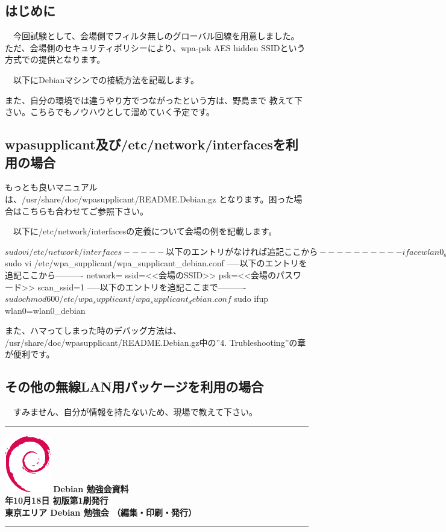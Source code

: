 \documentclass[mingoth,a4paper]{jsarticle}
\newcommand{\debmtgyear}{2015}
\newcommand{\debmtgmonth}{10}
\newcommand{\debmtgdate}{18}
\begin{document}
 \subsection{はじめに}

　今回試験として、会場側でフィルタ無しのグローバル回線を用意しました。
ただ、会場側のセキュリティポリシーにより、wpa-psk AES hidden SSIDという
方式での提供となります。

　以下にDebianマシンでの接続方法を記載します。

 また、自分の環境では違うやり方でつながったという方は、野島まで
教えて下さい。こちらでもノウハウとして溜めていく予定です。

 \subsection{wpasupplicant及び/etc/network/interfacesを利用の場合}

 もっとも良いマニュアルは、/usr/share/doc/wpasupplicant/README.Debian.gz
となります。困った場合はこちらも合わせてご参照下さい。

　以下に/etc/network/interfacesの定義について会場の例を記載します。

\begin{commandline}
$ sudo vi /etc/network/interfaces
-----以下のエントリがなければ追記ここから----------
iface wlan0_debian inet dhcp
     wpa-conf /etc/wpa_supplicant/wpa_supplicant_debian.conf
-----以下のエントリがなければ追記ここまで----------
$ sudo vi /etc/wpa_supplicant/wpa_supplicant_debian.conf
-----以下のエントリを追記ここから----------
network={
     ssid=<<会場のSSID>>
     psk=<<会場のパスワード>>
     scan_ssid=1
}
-----以下のエントリを追記ここまで----------
$ sudo chmod 600 /etc/wpa_supplicant/wpa_supplicant_debian.conf
$ sudo ifup wlan0=wlan0_debian
\end{commandline}

 また、ハマってしまった時のデバッグ方法は、
/usr/share/doc/wpasupplicant/README.Debian.gz中の''4. Trubleshooting''の章が便利です。

 \subsection{その他の無線LAN用パッケージを利用の場合}

　すみません、自分が情報を持たないため、現場で教えて下さい。

\cleartooddpage

\vspace*{15cm}
\hrule
\vspace{2mm}
\includegraphics[width=2cm]{image200502/openlogo-nd.eps}
\noindent \Large \bf Debian 勉強会資料\\
\noindent \normalfont \debmtgyear{}年\debmtgmonth{}月\debmtgdate{}日 \hspace{5mm}  初版第1刷発行\\
\noindent \normalfont 東京エリア Debian 勉強会 （編集・印刷・発行）\\
\hrule
\end{document}
